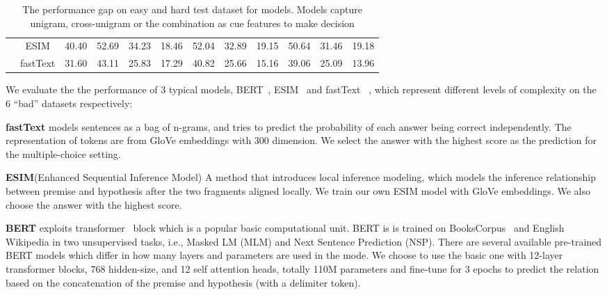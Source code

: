 \begin{table}[th]
\begin{tabular}{c|c|llll|lll|lll}
\multicolumn{1}{c|}{}                        & ESIM                       & \multicolumn{1}{l|}{40.40}    & 52.69                         & 34.23                         & 18.46                         & 52.04                         & 32.89                         & 19.15                         & 50.64                         & 31.46                         & 19.18                        \\
\multicolumn{1}{c|}{}                        & fastText                   & \multicolumn{1}{l|}{31.60}    & 43.11                         & 25.83                         & 17.29                         & 40.82                         & 25.66                         & 15.16                         & 39.06                         & 25.09                         & 13.96                        \\ \hline
\end{tabular}
\caption{\label{best_acc} The performance gap on easy and hard test dataset for models. 
Models capture unigram, cross-unigram or the combination as cue features to make decision}
\end{table}


We evaluate the the performance of 3 typical models, 
BERT~\cite{devlin2018bert}, ESIM~\cite{peters2018deep} and fastText~\cite{joulin2017bag} , 
which represent different levels of complexity on the 6 ``bad'' datasets respectively:

\textbf{fastText} models sentences as a bag of n-grams, and tries to predict
the probability of each answer being correct independently. The representation of 
tokens are from GloVe embeddings with 300 dimension. We select the answer with the highest
score as the prediction for the multiple-choice setting.

\textbf{ESIM}(Enhanced Sequential Inference Model) 
A method that introduces local inference modeling,
which models the inference relationship between
premise and hypothesis after the two fragments aligned
locally. We train our own ESIM model
with GloVe embeddings.  We also choose the answer with the highest
score.

\textbf{BERT} exploits transformer~\cite{vaswani2017attention}
block  which is a popular basic computational unit. BERT is
is trained on BooksCorpus~\cite{zhu2015aligning} and English Wikipedia in two unsupervised
tasks, i.e., Masked LM (MLM) and Next Sentence Prediction (NSP). 
There are several available pre-trained BERT models which differ in how
many layers and parameters are used in the mode. 
We choose to use the basic one with 12-layer transformer blocks, 768 hidden-size, and 12 self attention
heads, totally 110M parameters 
and fine-tune for 3 epochs to predict
the relation based on the concatenation of the
premise and hypothesis (with a delimiter token).

